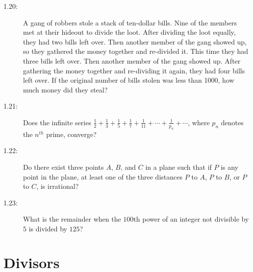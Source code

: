\documentclass{article}
\begin{document}
\begin{description}
\begin{description}
      \item[1.20:] A gang of robbers stole a stack of ten-dollar bills. Nine of the members met at their hideout to divide the loot. After dividing the loot equally, they had two bills left over. Then another member of the gang showed up, so they gathered the money together and re-divided it. This time they had three bills left over. Then another member of the gang showed up. After gathering the money together and re-dividing it again, they had four bills left over. If the original number of bills stolen was less than 1000, how much money did they steal?
      \item[1.21:] Does the infinite series $\frac{1}{2}+\frac{1}{3}+\frac{1}{5}+\frac{1}{7}+\frac{1}{11}+\cdots+\frac{1}{p_n}+\cdots$, where $p_n$ denotes the $n^{th}$ prime, converge?
      \item[1.22:] Do there exist three points $A$, $B$, and $C$ in a plane such that if $P$ is any point in the plane, at least one of the three distances $P$ to $A$, $P$ to $B$, or $P$ to $C$, is irrational?
      \item[1.23:] What is the remainder when the $100$th power of an integer not divisible by $5$ is divided by $125$?
    \end{description}

\end{description}


\section{Divisors}
\end{document}

